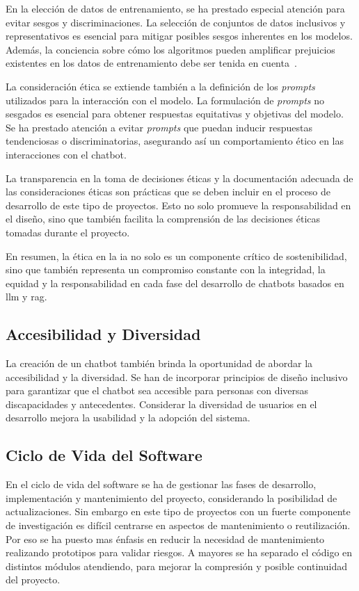 En la elección de datos de entrenamiento, se ha prestado especial atención para evitar sesgos y discriminaciones. La selección de conjuntos de datos inclusivos y representativos es esencial para mitigar posibles sesgos inherentes en los modelos. Además, la conciencia sobre cómo los algoritmos pueden amplificar prejuicios existentes en los datos de entrenamiento debe ser tenida en cuenta~\cite{Etzioni2017-ETZIEI}.

La consideración ética se extiende también a la definición de los \textit{prompts} utilizados para la interacción con el modelo. La formulación de \textit{prompts} no sesgados es esencial para obtener respuestas equitativas y objetivas del modelo. Se ha prestado atención a evitar \textit{prompts} que puedan inducir respuestas tendenciosas o discriminatorias, asegurando así un comportamiento ético en las interacciones con el chatbot.

La transparencia en la toma de decisiones éticas y la documentación adecuada de las consideraciones éticas son prácticas que se deben incluir en el proceso de desarrollo de este tipo de proyectos. Esto no solo promueve la responsabilidad en el diseño, sino que también facilita la comprensión de las decisiones éticas tomadas durante el proyecto.

En resumen, la ética en la \acrlong{ia} no solo es un componente crítico de sostenibilidad, sino que también representa un compromiso constante con la integridad, la equidad y la responsabilidad en cada fase del desarrollo de chatbots basados en \acrshort{llm} y \acrshort{rag}.

\subsection{Accesibilidad y Diversidad}

La creación de un chatbot también brinda la oportunidad de abordar la accesibilidad y la diversidad. Se han de incorporar principios de diseño inclusivo para garantizar que el chatbot sea accesible para personas con diversas discapacidades y antecedentes. Considerar la diversidad de usuarios en el desarrollo mejora la usabilidad y la adopción del sistema.

\subsection{Ciclo de Vida del Software}

En el ciclo de vida del software se ha de gestionar las fases de desarrollo, implementación y mantenimiento del proyecto, considerando la posibilidad de actualizaciones. Sin embargo en este tipo de proyectos con un fuerte componente de investigación es difícil centrarse en aspectos de mantenimiento o reutilización. Por eso se ha puesto mas énfasis en reducir la necesidad de mantenimiento realizando prototipos para validar riesgos. A mayores se ha separado el código en distintos módulos atendiendo, para mejorar la compresión y posible continuidad del proyecto.

